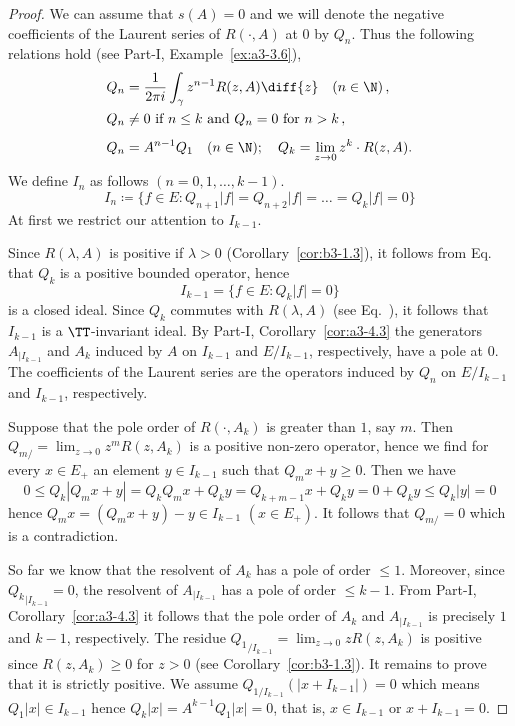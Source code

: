 \begin{proof}
	We can assume that $s(A) = 0$ and we will denote the negative coefficients of the Laurent series of\/ $R(\cdot,A)$ at $0$ by $Q_{n}$.
	Thus the following relations hold (see Part-I, Example~\ref{ex:a3-3.6}),
	\begin{equation}\label{eq:b3-2.17}
	\begin{split}
		Q_{n} &= \frac{1}{2\pi i}\int_{\gamma} z^{n-1}R(z,A)  \diff{z} \quad (n \in \N)\,, \\
		Q_{n} &\neq 0 \text{ if } n \leq k \text{ and } Q_{n} = 0 \text{ for } n > k\,, \\
		\rule{0ex}{3ex} Q_{n} &= A^{n-1}Q_{1} \quad (n \in \N); \quad Q_{k} = \lim_{z \to 0}z^{k}\cdot R(z,A).
	\end{split}
	\end{equation}
	We define $I_{n}$ as follows $(n = 0,1,\ldots,k-1)$.
	\[
	I_{n} \coloneqq \{f \in E \colon Q_{n+1}|f| = Q_{n+2}|f| = \ldots = Q_{k}|f| = 0\}
	\]
	At first we restrict our attention to $I_{k-1}$.
	
	Since $R(\lambda,A)$ is positive if\/ $\lambda > 0$ (Corollary~\ref{cor:b3-1.3}), it follows from Eq.~ that $Q_{k}$ is a positive bounded operator, hence 
    \[
    I_{k-1} = \{f \in E \colon Q_{k}|f| = 0\}
    \]
    is a closed ideal.
	Since $Q_{k}$ commutes with $R(\lambda,A)$ (see Eq.~), it follows that $I_{k-1}$ is a $\TT$-invariant ideal.
	By Part-I, Corollary~\ref{cor:a3-4.3} the generators $A_{|I_{k-1}}$ and $A_{k}$ induced by $A$ on $I_{k-1}$ and $E/I_{k-1}$, respectively, have a pole at $0$.
	The coefficients of the Laurent series are the operators induced by $Q_{n}$ on $E/I_{k-1}$ and $I_{k-1}$, respectively.
	
	Suppose that the pole order of\/ $R(\cdot,A_{k})$ is greater than $1$, say $m$.
	Then $Q_{m/} = \lim_{z \to 0}z^{m}R(z,A_{k})$ is a positive non-zero operator, hence we find for every $x \in E_{+}$ an element $y \in I_{k-1}$ such that $Q_{m}x + y \geq 0$.
	Then we have
	\[
	0 \leq Q_{k}|Q_{m}x + y| = Q_{k}Q_{m}x + Q_{k}y = Q_{k+m-1}x + Q_{k}y = 0 + Q_{k}y \leq Q_{k}|y| = 0
	\]
	hence $Q_{m}x = (Q_{m}x + y) - y \in I_{k-1}$ $(x \in E_{+})$.
	It follows that $Q_{m/} = 0$ which is a contradiction.
	
	So far we know that the resolvent of\/ $A_{k}$ has a pole of order $\leq 1$.
	Moreover, since ${Q_{k}}_{|I_{k-1}} = 0$, 
	the resolvent of\/ $A_{|I_{k-1}}$ has a pole of order $\leq k-1$.
	From Part-I, Corollary~\ref{cor:a3-4.3} it follows that the pole order of\/ $A_{k}$ and $A_{|I_{k-1}}$ is precisely $1$ and $k-1$, respectively.
	The residue ${Q_{1}}_{/I_{k-1}} = \lim_{z \to 0}zR(z,A_{k})$ is positive since $R(z,A_{k}) \geq 0$ for $z > 0$ (see Corollary~\ref{cor:b3-1.3}).
	It remains to prove that it is strictly positive. We assume $Q_{1/I_{k-1}}(|x + I_{k-1}|) = 0$ which means $Q_{1}|x| \in I_{k-1}$ hence $Q_{k}|x| = A^{k-1}Q_{1}|x| = 0$, that is, $x \in I_{k-1}$ or $x + I_{k-1} = 0$.
	

\end{proof}

